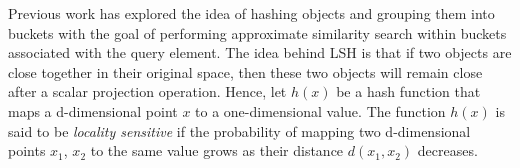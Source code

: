 \documentclass[conference]{IEEEtran}
\begin{document}
Previous work \cite{hashing_algoritghms_survey} has explored the idea of hashing objects and grouping them into buckets with the goal of performing approximate similarity search within buckets associated with the query element.  The idea behind LSH is that if two objects are close together in their original space, then these two objects will remain close after a scalar projection operation. Hence, let $h(x)$ be a hash function that maps a d-dimensional point $x$ to a one-dimensional value. The function $h(x)$ is said to be \textit{locality sensitive} if the probability of mapping two d-dimensional points $x_1$, $x_2$ to the same value grows as their distance $d(x_1, x_2)$ decreases.  



 
\end{document}
